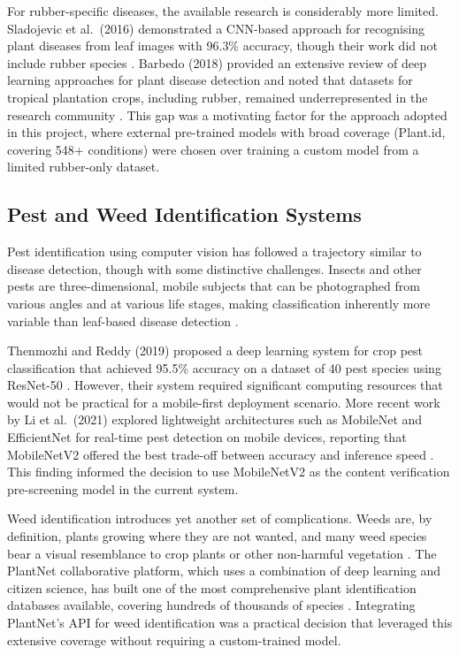 For rubber-specific diseases, the available research is considerably more limited. Sladojevic et al.\ (2016) demonstrated a CNN-based approach for recognising plant diseases from leaf images with 96.3\% accuracy, though their work did not include rubber species \cite{ref9}. Barbedo (2018) provided an extensive review of deep learning approaches for plant disease detection and noted that datasets for tropical plantation crops, including rubber, remained underrepresented in the research community \cite{ref10}. This gap was a motivating factor for the approach adopted in this project, where external pre-trained models with broad coverage (Plant.id, covering 548+ conditions) were chosen over training a custom model from a limited rubber-only dataset.

\subsection{Pest and Weed Identification Systems}

Pest identification using computer vision has followed a trajectory similar to disease detection, though with some distinctive challenges. Insects and other pests are three-dimensional, mobile subjects that can be photographed from various angles and at various life stages, making classification inherently more variable than leaf-based disease detection \cite{ref11}.

Thenmozhi and Reddy (2019) proposed a deep learning system for crop pest classification that achieved 95.5\% accuracy on a dataset of 40 pest species using ResNet-50 \cite{ref12}. However, their system required significant computing resources that would not be practical for a mobile-first deployment scenario. More recent work by Li et al.\ (2021) explored lightweight architectures such as MobileNet and EfficientNet for real-time pest detection on mobile devices, reporting that MobileNetV2 offered the best trade-off between accuracy and inference speed \cite{ref13}. This finding informed the decision to use MobileNetV2 as the content verification pre-screening model in the current system.

Weed identification introduces yet another set of complications. Weeds are, by definition, plants growing where they are not wanted, and many weed species bear a visual resemblance to crop plants or other non-harmful vegetation \cite{ref14}. The PlantNet collaborative platform, which uses a combination of deep learning and citizen science, has built one of the most comprehensive plant identification databases available, covering hundreds of thousands of species \cite{ref15}. Integrating PlantNet's API for weed identification was a practical decision that leveraged this extensive coverage without requiring a custom-trained model.

